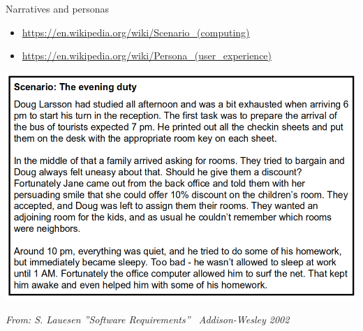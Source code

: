 \begin{Slide}{Narratives and personas}

\begin{itemize}
\item \footnotesize\url{https://en.wikipedia.org/wiki/Scenario_(computing)}
\item \url{https://en.wikipedia.org/wiki/Persona_(user_experience)}

\end{itemize}
\begin{minipage}[t]{0.85\textwidth}
\vspace{-0.4em}\includegraphics[width=1.0\textwidth]{../img/vivid-scenario}
\vspace{-1.0em}
\end{minipage}

{\fontsize{5}{5}\itshape\selectfont From: S. Lauesen ''Software Requirements'' \textcopyright~Addison-Wesley 2002}

\end{Slide}
